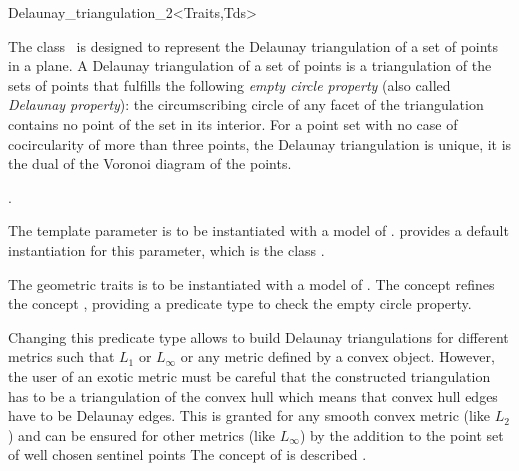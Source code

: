 

\begin{ccRefClass}{Delaunay_triangulation_2<Traits,Tds>}  %


\ccDefinition
  
The class \ccRefName\ is designed to represent
the Delaunay triangulation of a set of points in a plane.
A  Delaunay triangulation of a set of points
is a triangulation of the sets of points that fulfills
the following {\em empty circle property} 
(also called {\em Delaunay property}): the circumscribing
circle of any facet
of the triangulation contains no point of the set in its interior.
For a point set with no case of cocircularity 
of more than three points,
the Delaunay triangulation is unique, it is  the dual
of the Voronoi diagram of the points.

\ccInheritsFrom
{}.

\ccParameters
The template parameter 
is to be instantiated with a model of
.
\cgal provides a default instantiation for this parameter,
which is the class 
.

The geometric traits  
is to be instantiated with a model of
.
The concept  refines the
concept , providing
a predicate type 
to check the empty circle property.

Changing this predicate type
allows to build Delaunay triangulations for different metrics
such that $L_1$ or $L_{\infty}$ or any metric defined by a
convex object. However, the user of an exotic metric
must be careful that the constructed triangulation 
has to be a triangulation of the convex hull
which means that convex hull edges have to be Delaunay edges.
This is granted for any smooth convex metric (like $L_2$)
and can be ensured for other metrics (like  $L_{\infty}$)
by the addition to the point set of well chosen sentinel points
The concept of  is  described
.


\end{ccRefClass}
